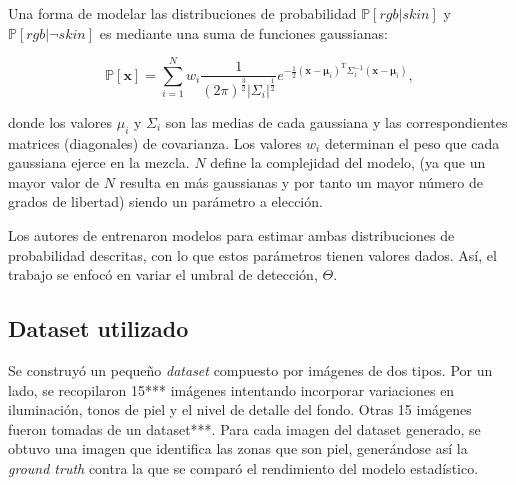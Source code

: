\documentclass[12pt]{article}
\begin{document}
Una forma de modelar las distribuciones de probabilidad  $\mathbb{P} [ rgb|skin
]$ y $\mathbb{P} [ rgb | \neg skin ]$ es mediante una suma de funciones
gaussianas:

\begin{equation}
    \mathbb{P}[\mathbf{x}] = \sum\limits_{i=1}^N w_i
    \frac{1}{(2\pi)^{\frac{3}{2}} | \Sigma_i |^\frac{1}{2}} e^{-\frac{1}{2}
    (\mathbf{x} - \mathbf{\mu}_i)^{\text{T}} \Sigma_i ^{-1} (\mathbf{x} -
    \mathbf{\mu}_i)},
\end{equation} 

donde los valores $\mu_i$ y $\Sigma_i$ son las medias de cada gaussiana y las
correspondientes matrices (diagonales) de covarianza. Los valores $w_i$
determinan el peso que cada gaussiana ejerce en la mezcla. $N$ define la
complejidad del modelo, (ya que un mayor valor de $N$ resulta en más gaussianas
y por tanto un mayor número de grados de libertad) siendo un parámetro a
elección. 

Los autores de \cite{skin} entrenaron modelos para estimar ambas
distribuciones de probabilidad descritas, con lo que estos parámetros tienen
valores dados. Así, el trabajo se enfocó en variar el umbral de detección,
$\Theta$.

\subsection{Dataset utilizado}

Se construyó un pequeño \emph{dataset} compuesto por imágenes de dos tipos. Por
un lado, se recopilaron 15*** imágenes intentando incorporar variaciones en
iluminación, tonos de piel y el nivel de detalle del fondo. Otras 15 imágenes
fueron tomadas de un dataset***. Para cada imagen del dataset generado, se
obtuvo una imagen que identifica las zonas que son piel, generándose así la
\emph{ground truth} contra la que se comparó el rendimiento del modelo
estadístico.
\end{document}
